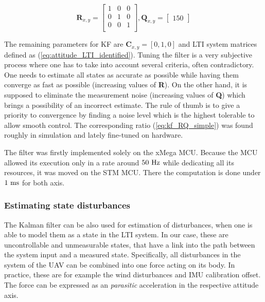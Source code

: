 \begin{equation}
\textbf{R}_{x,y} = \begin{bmatrix}
1 & 0 & 0 \\
0 & 1 & 0 \\
0 & 0 & 1 \\
\end{bmatrix}, 
\textbf{Q}_{x, y} = \begin{bmatrix}
150
\end{bmatrix}
\label{eq:kf_RQ_simple}
\end{equation}

The remaining parameters for KF are $\textbf{C}_{x, y} = \left[0, 1, 0\right]$ and LTI system matrices defined as (\ref{eq:attitude_LTI_identified}). Tuning the filter is a very subjective process where one has to take into account several criteria, often contradictory. One needs to estimate all states as accurate as possible while having them converge as fast as possible (increasing values of \textbf{R}). On the other hand, it is supposed to eliminate the measurement noise (increasing values of \textbf{Q}) which brings a possibility of an incorrect estimate. The rule of thumb is to give a priority to convergence by finding a noise level which is the highest tolerable to allow smooth control. The corresponding ratio (\ref{eq:kf_RQ_simple}) was found roughly in simulation and lately fine-tuned on hardware.

The filter was firstly implemented solely on the xMega MCU. Because the MCU allowed its execution only in a rate around $50~\mathrm{Hz}$ while dedicating all its resources, it was moved on the STM MCU. There the computation is done under $1~\mathrm{ms}$ for both axis.

\subsubsection{Estimating state disturbances}

The Kalman filter can be also used for estimation of disturbances, when one is able to model them as a state in the LTI system. In our case, these are uncontrollable and unmeasurable states, that have a link into the path between the system input and a measured state. Specifically, all disturbances in the system of the UAV can be combined into one force acting on its body. In practice, these are for example the wind disturbances and IMU calibration offset. The force can be expressed as an \textit{parasitic} acceleration in the respective attitude axis. 

